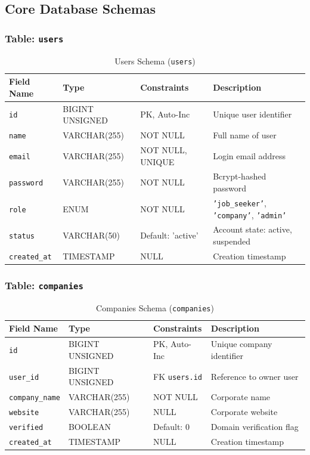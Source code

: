 \subsection{Core Database Schemas}

\subsubsection{Table: \texttt{users}}
\begin{table}[h!]
\centering
\small
\caption{Users Schema (\texttt{users})}
\label{tab:schema_users}
\begin{tabular}{|p{3cm}|p{2.8cm}|p{2.2cm}|p{5.5cm}|}
\hline
\textbf{Field Name} & \textbf{Type} & \textbf{Constraints} & \textbf{Description} \\ \hline
\texttt{id} & BIGINT UNSIGNED & PK, Auto-Inc & Unique user identifier \\ \hline
\texttt{name} & VARCHAR(255) & NOT NULL & Full name of user \\ \hline
\texttt{email} & VARCHAR(255) & NOT NULL, UNIQUE & Login email address \\ \hline
\texttt{password} & VARCHAR(255) & NOT NULL & Bcrypt-hashed password \\ \hline
\texttt{role} & ENUM & NOT NULL & \texttt{'job\_seeker'}, \texttt{'company'}, \texttt{'admin'} \\ \hline
\texttt{status} & VARCHAR(50) & Default: 'active' & Account state: active, suspended \\ \hline
\texttt{created\_at} & TIMESTAMP & NULL & Creation timestamp \\ \hline
\end{tabular}
\end{table}

\subsubsection{Table: \texttt{companies}}
\begin{table}[h!]
\centering
\small
\caption{Companies Schema (\texttt{companies})}
\label{tab:schema_companies}
\begin{tabular}{|p{3cm}|p{2.8cm}|p{2.2cm}|p{5.5cm}|}
\hline
\textbf{Field Name} & \textbf{Type} & \textbf{Constraints} & \textbf{Description} \\ \hline
\texttt{id} & BIGINT UNSIGNED & PK, Auto-Inc & Unique company identifier \\ \hline
\texttt{user\_id} & BIGINT UNSIGNED & FK \texttt{users.id} & Reference to owner user \\ \hline
\texttt{company\_name} & VARCHAR(255) & NOT NULL & Corporate name \\ \hline
\texttt{website} & VARCHAR(255) & NULL & Corporate website \\ \hline
\texttt{verified} & BOOLEAN & Default: 0 & Domain verification flag \\ \hline
\texttt{created\_at} & TIMESTAMP & NULL & Creation timestamp \\ \hline
\end{tabular}
\end{table}

